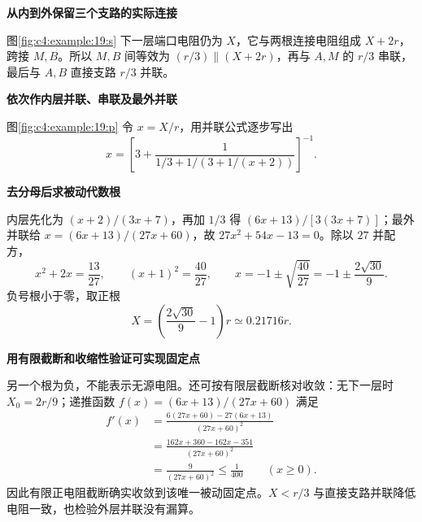 \begin{solution}\textbf{从内到外保留三个支路的实际连接}\par\nobreak
图\ref{fig:c4:example:19:s} 下一层端口电阻仍为 $X$，它与两根连接电阻组成 $X+2r$，跨接 $M,B$。所以 $M,B$ 间等效为 $(r/3)\parallel(X+2r)$，再与 $A,M$ 的 $r/3$ 串联，最后与 $A,B$ 直接支路 $r/3$ 并联。



\par\medskip{}\noindent\textbf{依次作内层并联、串联及最外并联}\par\nobreak
图\ref{fig:c4:example:19:p} 令 $x=X/r$，用并联公式逐步写出
\[
 x=\left[3+\frac1{1/3+1/(3+1/(x+2))}\right]^{-1}.
\]


\par\medskip{}\noindent\textbf{去分母后求被动代数根}\par\nobreak
内层先化为 $(x+2)/(3x+7)$，再加 $1/3$ 得 $(6x+13)/[3(3x+7)]$；最外并联给 $x=(6x+13)/(27x+60)$，故 $27x^2+54x-13=0$。除以 $27$ 并配方，
\[
 x^2+2x=\frac{13}{27},\qquad
 (x+1)^2=\frac{40}{27},\qquad
 x=-1\pm\sqrt{\frac{40}{27}}=-1\pm\frac{2\sqrt{30}}9.
\]
负号根小于零，取正根
\[
 X=\left(\frac{2\sqrt{30}}9-1\right)r\simeq0.21716r.
\]


\par\medskip{}\noindent\textbf{用有限截断和收缩性验证可实现固定点}\par\nobreak
另一个根为负，不能表示无源电阻。还可按有限层截断核对收敛：无下一层时 $X_0=2r/9$；递推函数 $f(x)=(6x+13)/(27x+60)$ 满足
\begin{align*}
 f'(x)&=\frac{6(27x+60)-27(6x+13)}{(27x+60)^2}\\
 &=\frac{162x+360-162x-351}{(27x+60)^2}\\
 &=\frac9{(27x+60)^2}\le\frac1{400}\qquad(x\ge0).
\end{align*}
因此有限正电阻截断确实收敛到该唯一被动固定点。$X<r/3$ 与直接支路并联降低电阻一致，也检验外层并联没有漏算。\end{solution}
